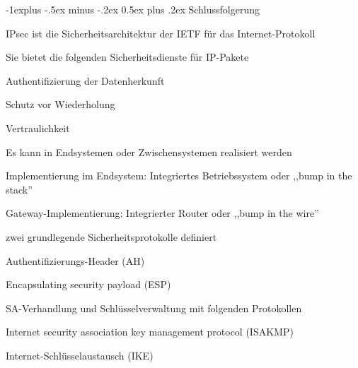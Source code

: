 \documentclass[a4paper]{article}
\makeatletter
\renewcommand{\subsection}{\@startsection{subsection}{2}{0mm}%
 {-1explus -.5ex minus -.2ex}%
 {0.5ex plus .2ex}%
 {\normalfont\normalsize\bfseries}}
\makeatother
\begin{document}
\begin{multicols}{3}
      \subsection{Schlussfolgerung}
      \begin{itemize*}
            \item IPsec ist die Sicherheitsarchitektur der IETF für das Internet-Protokoll
            \item Sie bietet die folgenden Sicherheitsdienste für IP-Pakete
            \begin{itemize*}
                  \item Authentifizierung der Datenherkunft
                  \item Schutz vor Wiederholung
                  \item Vertraulichkeit
            \end{itemize*}
            \item Es kann in Endsystemen oder Zwischensystemen realisiert werden
            \begin{itemize*}
                  \item Implementierung im Endsystem: Integriertes Betriebssystem oder ,,bump in the stack''
                  \item Gateway-Implementierung: Integrierter Router oder ,,bump in the wire''
            \end{itemize*}
            \item zwei grundlegende Sicherheitsprotokolle definiert
            \begin{itemize*}
                  \item Authentifizierungs-Header (AH)
                  \item Encapsulating security payload (ESP)
            \end{itemize*}
            \item SA-Verhandlung und Schlüsselverwaltung mit folgenden Protokollen
            \begin{itemize*}
                  \item Internet security association key management protocol (ISAKMP)
                  \item Internet-Schlüsselaustausch (IKE)
            \end{itemize*}
      \end{itemize*}


\end{multicols}
\end{document}
